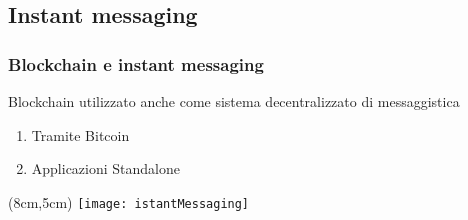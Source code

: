 \subsection{Instant messaging}
\begin{frame}
 \frametitle{Blockchain e instant messaging}
 
 Blockchain utilizzato anche come sistema decentralizzato di messaggistica
 \begin{enumerate}
  \item<1-> Tramite Bitcoin
  \item<2-> Applicazioni Standalone
 \end{enumerate}
 
 \begin{textblock*}{5cm}(8cm,5cm)
  \texttt{[image: istantMessaging]}
 \end{textblock*}

\end{frame}
